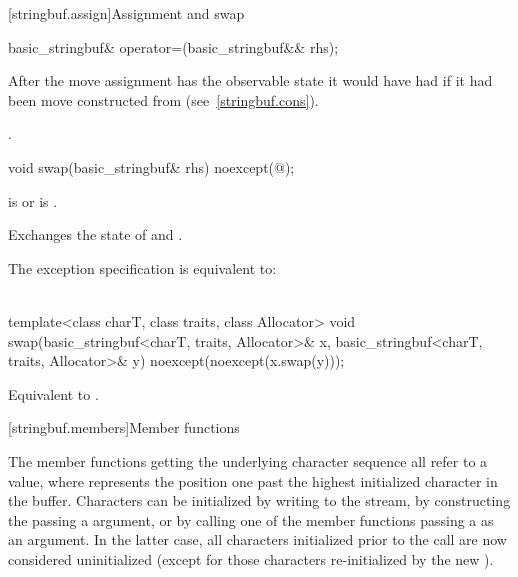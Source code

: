 [stringbuf.assign]{Assignment and swap}

%
\begin{itemdecl}
basic_stringbuf& operator=(basic_stringbuf&& rhs);
\end{itemdecl}

\begin{itemdescr}
\pnum
\effects
After the move assignment  has the observable state it would
have had if it had been move constructed from  (see~\ref{stringbuf.cons}).

\pnum
\returns
{}.
\end{itemdescr}

%
\begin{itemdecl}
void swap(basic_stringbuf& rhs) noexcept(@\seebelow@);
\end{itemdecl}

\begin{itemdescr}
\pnum
\expects
{}
is  or
 is .

\pnum
\effects
Exchanges the state of 
and .

\pnum
\remarks
The exception specification is equivalent to:\\
\\
\end{itemdescr}

%
\begin{itemdecl}
template<class charT, class traits, class Allocator>
  void swap(basic_stringbuf<charT, traits, Allocator>& x,
            basic_stringbuf<charT, traits, Allocator>& y) noexcept(noexcept(x.swap(y)));
\end{itemdecl}

\begin{itemdescr}
\pnum
\effects
Equivalent to .
\end{itemdescr}

[stringbuf.members]{Member functions}

\pnum
The member functions getting the underlying character sequence
all refer to a  value,
where  represents the position
one past the highest initialized character in the buffer.
Characters can be initialized by writing to the stream,
by constructing the 
passing a  argument, or
by calling one of the  member functions
passing a  as an argument.
In the latter case, all characters initialized prior to the call
are now considered uninitialized
(except for those characters re-initialized by the new ).

